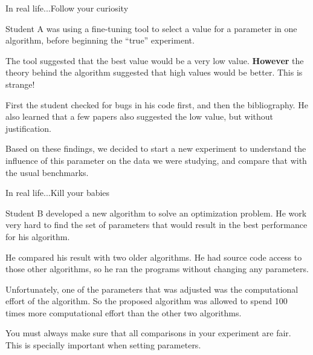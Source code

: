 \documentclass[t]{beamer}
\begin{document}
\begin{ftst}
  {In real life...}{Follow your curiosity}

  Student A was using a fine-tuning tool to select a value for a
  parameter in one algorithm, before beginning the ``true''
  experiment.

  \vone

  The tool suggested that the best value would be a very low
  value. {\bf However} the theory behind the algorithm suggested that
  high values would be better. This is strange!

  \vone

  First the student checked for bugs in his code first, and then the
  bibliography. He also learned that a few papers also suggested the low
  value, but without justification.

  \vone

  Based on these findings, we decided to start a new experiment to
  understand the influence of this parameter on the data we were
  studying, and compare that with the usual benchmarks.
\end{ftst}

\begin{ftst}
  {In real life...}{Kill your babies}

  Student B developed a new algorithm to solve an optimization
  problem. He work very hard to find the set of parameters that would
  result in the best performance for his algorithm.

  \vone

  He compared his result with two older algorithms. He had source code
  access to those other algorithms, so he ran the programs without
  changing any parameters.

  \vone

  Unfortunately, one of the parameters that was adjusted was the
  computational effort of the algorithm. So the proposed algorithm was
  allowed to spend 100 times more computational effort than the other
  two algorithms.

  \vone

  You must always make sure that all comparisons in your experiment
  are fair. This is specially important when setting parameters.
\end{ftst}

\end{document}
